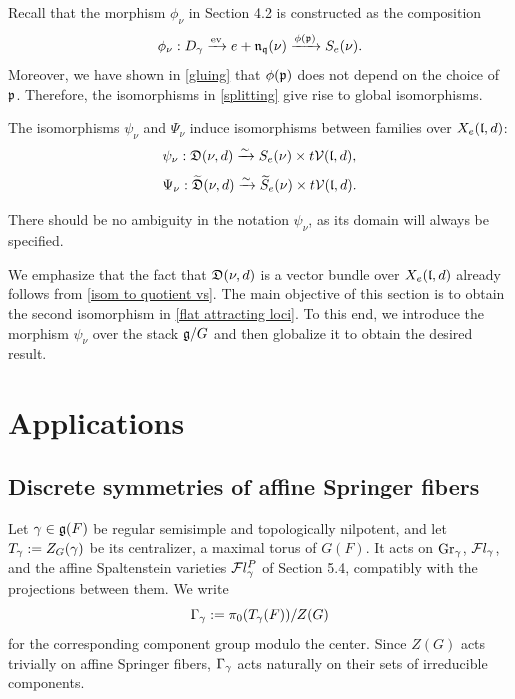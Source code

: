 \documentclass[11pt]{article}
\numberwithin{equation}{section}
\begin{document}
Recall that the morphism $\phi_\nu$ in Section 4.2 is constructed as the composition 
$$\phi_\nu: D_\gamma \xrightarrow{\operatorname{ev}} e+\mathfrak{n}_{\mathfrak{q}}(\nu)\xrightarrow{\phi(\mathfrak{p})} S_e(\nu).$$
Moreover, we have shown in \cref{gluing} that $\phi(\mathfrak{p})$ does not depend on the choice of $\mathfrak{p}$. Therefore, the isomorphisms in \cref{splitting} give rise to global isomorphisms.
\begin{pro}\label{flat attracting loci}
The isomorphisms $\psi_\nu$ and $\Psi_\nu$ induce isomorphisms between families over $X_e(\mathfrak{l},d)$:
\[
\psi_\nu: \mathfrak{D}(\nu,d)\xrightarrow{\sim}
S_e(\nu)\times t\mathcal{V}(\mathfrak{l},d),
\]
\[
\Psi_\nu: \widetilde{\mathfrak{D}}(\nu,d)\xrightarrow{\sim}
\widetilde{S}_e(\nu)\times t\mathcal{V}(\mathfrak{l},d).
\]
\end{pro}
There should be no ambiguity in the notation $\psi_\nu$, as its domain
will always be specified.
\begin{rem}
We emphasize that the fact that $\mathfrak{D}(\nu,d)$ is a vector bundle over
$X_e(\mathfrak{l},d)$ already follows from \cref{isom to quotient vs}.
The main objective of this section is to obtain the second isomorphism
in \cref{flat attracting loci}. To this end, we introduce the morphism
$\psi_\nu$ over the stack $\mathfrak{g}/G$ and then globalize it to obtain the desired result.
\end{rem}








\section{Applications}

\subsection{Discrete symmetries of affine Springer fibers}
Let $\gamma\in\mathfrak{g}(F)$ be regular semisimple and topologically nilpotent, and let
$T_\gamma:=Z_G(\gamma)$ be its centralizer, a maximal torus of $G(F)$. It acts on
$\operatorname{Gr}_\gamma$, $\mathcal{F}l_\gamma$, and the affine Spaltenstein varieties $\mathcal{F}l_\gamma^P$ of
Section 5.4, compatibly with the projections between them. We write
\[
\Gamma_\gamma:=
\pi_0(T_\gamma(F))/Z(G)
\]
for the corresponding component group modulo the center. Since $Z(G)$ acts
trivially on affine Springer fibers, $\Gamma_\gamma$ acts naturally
on their sets of irreducible components.
\end{document}
